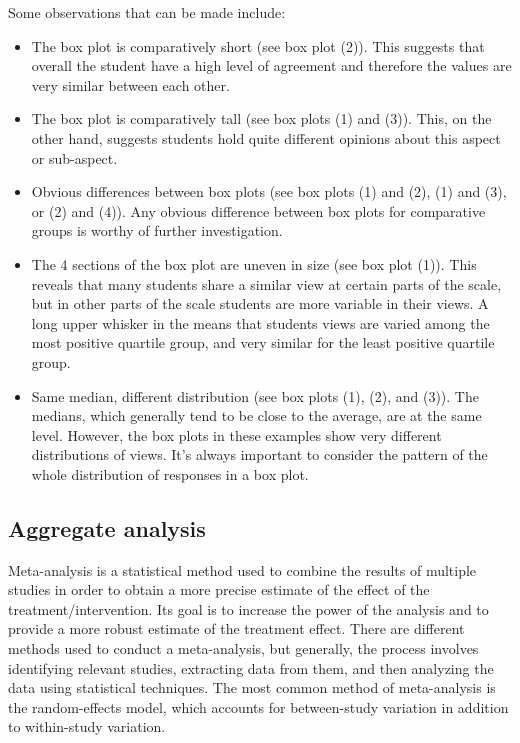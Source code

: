 Some observations that can be made include:
\begin{itemize}
    \item The box plot is comparatively short (see box plot  (2)). This suggests that overall the student have a high level of agreement and therefore the values are very similar between each other.
    \item The box plot is comparatively tall (see box plots (1) and (3)). This, on the other hand, suggests students hold quite different opinions about this aspect or sub-aspect.
    \item Obvious differences between box plots (see box plots (1) and (2), (1) and (3), or (2) and (4)). Any obvious difference between box plots for comparative groups is worthy of further investigation.
    \item The 4 sections of the box plot are uneven in size (see box plot (1)). This reveals that many students share a similar view at certain parts of the scale, but in other parts of the scale students are more variable in their views. A long upper whisker in the means that students views are varied among the most positive quartile group, and very similar for the least positive quartile group. 
    \item Same median, different distribution (see box plots (1), (2), and (3)). The medians, which generally tend to be close to the average, are at the same level. However, the box plots in these examples show very different distributions of views. It's always important to consider the pattern of the whole distribution of responses in a box plot.
\end{itemize}

\subsection{Aggregate analysis}
Meta-analysis is a statistical method used to combine the results of multiple studies in order to obtain a more precise estimate of the effect of the treatment/intervention. Its goal is to increase the power of the analysis and to provide a more robust estimate of the treatment effect.
There are different methods used to conduct a meta-analysis, but generally, the process involves identifying relevant studies, extracting data from them, and then analyzing the data using statistical techniques. The most common method of meta-analysis is the random-effects model, which accounts for between-study variation in addition to within-study variation.

